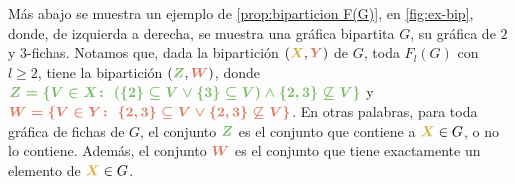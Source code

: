 M\'as abajo se muestra un ejemplo de \cref{prop:biparticion F(G)}, en
\cref{fig:ex-bip}, donde, de izquierda a derecha, se muestra una gr\'afica
bipartita $G$, su gr\'afica de $2$ y $3$-fichas. Notamos que, dada la
bipartici\'on $({\color{oro}\boldsymbol {X}},{\color{salmon}\boldsymbol {Y}})$
de $G$, toda $F_l(G)$ con $l\geq 2$, tiene la bipartici\'on $({\color{verde}
\boldsymbol {Z}},{\color{salmon}\boldsymbol {W}})$, donde
${\color{verde}\boldsymbol {Z=\{V\in X\colon\ (\{2\}\subseteq V  \lor \{3\}
\subseteq V) \land \{2,3\}\not\subseteq V\}}}$ y ${\color{salmon}\boldsymbol
{W=\{V \in Y\colon\ \{2,3\}\subseteq V \lor \{2,3\}\not\subseteq V\}}}$. En
otras palabras, para toda gr\'afica de fichas de $G$, el conjunto
${\color{verde}\boldsymbol {Z}}$ es el conjunto que contiene a
${\color{oro}\boldsymbol {X}}\in G$, o no lo contiene. Adem\'as, el conjunto
${\color{salmon}\boldsymbol {W}}$ es el conjunto que tiene exactamente un
elemento de ${\color{oro}\boldsymbol {X}}\in G$.

